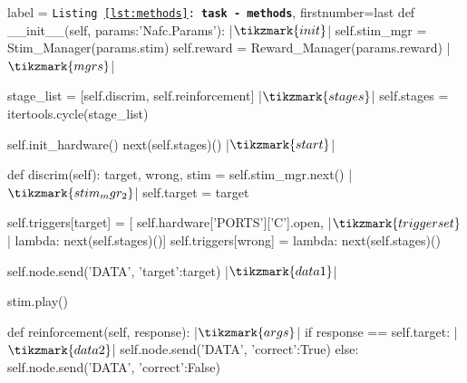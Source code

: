 \begin{listing}[h!]
\begin{pythoncode*}{label = \texttt{Listing \ref{lst:methods}: \textbf{task - methods}}, firstnumber=last}
    def __init__(self, params:'Nafc.Params'): |$\tikzmark{init}$|
        self.stim_mgr = Stim_Manager(params.stim)
        self.reward   = Reward_Manager(params.reward) |$\tikzmark{mgrs}$|

        stage_list  = [self.discrim, self.reinforcement] |$\tikzmark{stages}$|
        self.stages = itertools.cycle(stage_list)

        self.init_hardware()
        next(self.stages)() |$\tikzmark{start}$|

    def discrim(self):
        target, wrong, stim = self.stim_mgr.next() |$\tikzmark{stim_mgr_2}$|
        self.target = target

        self.triggers[target] = [
            self.hardware['PORTS']['C'].open, |$\tikzmark{triggerset}$|
            lambda: next(self.stages)()]
        self.triggers[wrong] = lambda: next(self.stages)()

        self.node.send('DATA', {'target':target}) |$\tikzmark{data1}$|

        stim.play()

    def reinforcement(self, response): |$\tikzmark{args}$|
        if response == self.target: |$\tikzmark{data2}$|
            self.node.send('DATA', {'correct':True})
        else:
            self.node.send('DATA', {'correct':False})


\end{pythoncode*}
\end{listing}
